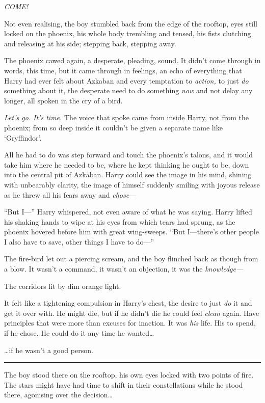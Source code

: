 \emph{COME!}

Not even realising, the boy stumbled back from the edge of the rooftop,
eyes still locked on the phoenix, his whole body trembling and tensed,
his fists clutching and releasing at his side; stepping back, stepping
away.

The phoenix cawed again, a desperate, pleading, sound. It didn't come
through in words, this time, but it came through in feelings, an echo of
everything that Harry had ever felt about Azkaban and every temptation
to \emph{action,} to just \emph{do} something about it, the desperate
need to do something \emph{now} and not delay any longer, all spoken in
the cry of a bird.

\emph{Let's go. It's time.} The voice that spoke came from inside Harry,
not from the phoenix; from so deep inside it couldn't be given a
separate name like `Gryffindor'.

All he had to do was step forward and touch the phoenix's talons, and it
would take him where he needed to be, where he kept thinking he ought to
be, down into the central pit of Azkaban. Harry could see the image in
his mind, shining with unbearably clarity, the image of himself suddenly
smiling with joyous release as he threw all his fears away and
\emph{chose}---

``But I---'' Harry whispered, not even aware of what he was saying.
Harry lifted his shaking hands to wipe at his eyes from which tears had
sprung, as the phoenix hovered before him with great wing-sweeps. ``But
I---there's other people I also have to save, other things I have to
do---''

The fire-bird let out a piercing scream, and the boy flinched back as
though from a blow. It wasn't a command, it wasn't an objection, it was
the \emph{knowledge---}

The corridors lit by dim orange light.

It felt like a tightening compulsion in Harry's chest, the desire to
just \emph{do} it and get it over with. He might die, but if he didn't
die he could feel \emph{clean} again. Have principles that were more
than excuses for inaction. It was \emph{his} life. His to spend, if he
chose. He could do it any time he wanted\ldots{}

\ldots{}if he wasn't a good person.

\begin{center}\rule{3in}{0.4pt}\end{center}

The boy stood there on the rooftop, his own eyes locked with two points
of fire. The stars might have had time to shift in their constellations
while he stood there, agonising over the decision\ldots{}

